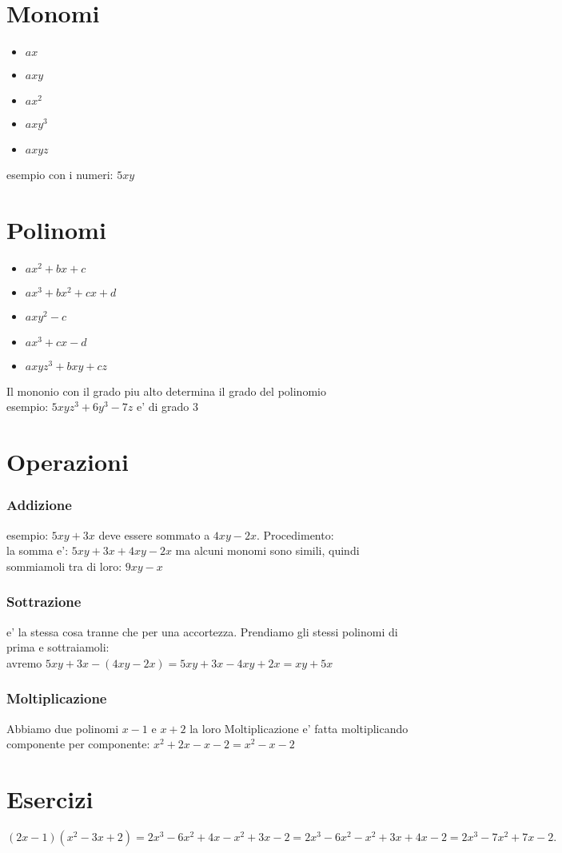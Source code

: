 \documentclass{article}
\begin{document}
    \section*{Monomi}
        \begin{itemize}
            \item $ax$
            \item $axy$
            \item $ax^2$
            \item $axy^3$
            \item $axyz$
        \end{itemize}
    esempio con i numeri: $5xy$

    \section*{Polinomi}
        \begin{itemize}
            \item $ax^2 + bx + c$
            \item $ax^3 + bx^2 + cx + d$
            \item $axy^2 - c$
            \item $ax^3 + cx - d$
            \item $axyz^3 + bxy + cz$
        \end{itemize}
        Il mononio con il grado piu alto determina il grado del polinomio \\
        esempio: $5xyz^3 + 6y^3 - 7z$ e' di grado $3$
    \section*{Operazioni}
        \subsubsection*{Addizione}
            esempio: $5xy + 3x$ deve essere sommato a $4xy - 2x$. Procedimento: \\
            la somma e': $5xy + 3x + 4xy - 2x$ ma alcuni monomi sono simili, quindi sommiamoli tra di loro:
            $9xy - x$
        \subsubsection*{Sottrazione}
            e' la stessa cosa tranne che per una accortezza. Prendiamo gli stessi polinomi di prima e sottraiamoli: \\
            avremo $5xy + 3x - (4xy - 2x) = 5xy + 3x - 4xy + 2x = xy + 5x$
        \subsubsection*{Moltiplicazione}
            Abbiamo due polinomi $x - 1$ e $x + 2$ la loro Moltiplicazione e' fatta moltiplicando componente per componente:
            $x^2 +2x - x  -2 = x^2-x -2$
            \newpage
        \section*{Esercizi}
        $(2x -1)(x^2 -3x +2) = 2x^3 - 6x^2 + 4x -x^2 + 3x - 2 = 2x^3 -6x^2 -x^2 +3x + 4x - 2 = 2x^3 - 7x^2 + 7x -2.$
\end{document}
